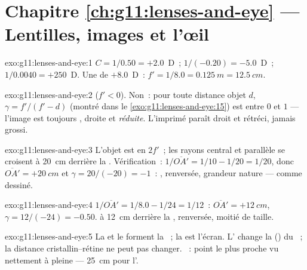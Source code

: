 \section*{Chapitre \ref{ch:g11:lenses-and-eye} --- Lentilles, images et l'œil}

\begin{solution}{exo:g11:lenses-and-eye:1}
$C = 1/0.50 = +2.0$~D~; $1/(-0.20) = -5.0$~D~; $1/0.0040 = +250$~D.
Une  de $+8.0$~D~:
$f' = 1/8.0 = \qty{0.125}{m} = \qty{12.5}{cm}$.
\end{solution}

\begin{solution}{exo:g11:lenses-and-eye:2}
 ($f' < 0$). Non~: pour toute distance
objet $d$, $\gamma = f'/(f' - d)$ (montré dans le
\cref{exo:g11:lenses-and-eye:15}) est entre $0$ et $1$ --- l'image est
toujours , droite et \emph{réduite}.
L'imprimé paraît droit et rétréci, jamais grossi.
\end{solution}

\begin{solution}{exo:g11:lenses-and-eye:3}
L'objet est en $2f'$~; les rayons central et parallèle se croisent à
\qty{20}{cm} derrière la . Vérification~:
$1/\overline{OA'} = 1/10 - 1/20 = 1/20$, donc
$\overline{OA'} = +\qty{20}{cm}$ et $\gamma = 20/(-20) = -1$~:
, renversée, grandeur nature --- comme dessiné.
\end{solution}

\begin{solution}{exo:g11:lenses-and-eye:4}
$1/\overline{OA'} = 1/8.0 - 1/24 = 1/12$~:
$\overline{OA'} = +\qty{12}{cm}$, $\gamma = 12/(-24) = -0.50$.
 à \qty{12}{cm} derrière la
, renversée, moitié de taille.
\end{solution}

\begin{solution}{exo:g11:lenses-and-eye:5}
La  et le 
forment la ~; la
 est l'écran.
L' change la
() du
~; la distance cristallin--rétine ne peut
pas changer. ~: point le plus proche
vu nettement à pleine  ---
\qty{25}{cm} pour l'.
\end{solution}

